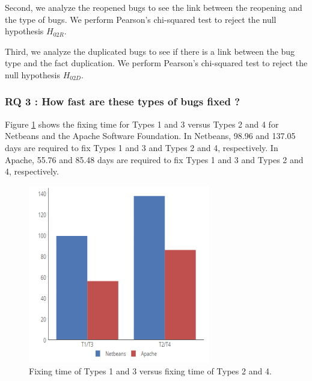 Second, we analyze the reopened bugs to see the link
between the reopening and the type of bugs. We perform
Pearson’s chi-squared test to reject the null hypothesis $H_{02R}$.

\noindent{}

Third, we analyze the duplicated bugs to see if there is a
link between the bug type and the fact duplication. We
perform Pearson’s chi-squared test to reject the null
hypothesis $H_{02D}$.

\noindent{}

\subsubsection{RQ 3 : How fast are these types of bugs fixed ?}

Figure \ref{fig:bug-taxo-rq3} shows the fixing time for Types 1 and 3 versus
Types 2 and 4 for Netbeans and the Apache Software
Foundation. In Netbeans, 98.96 and 137.05 days are required
to fix Types 1 and 3 and Types 2 and 4, respectively. In
Apache, 55.76 and 85.48 days are required to fix Types 1 and
3 and Types 2 and 4, respectively.


\begin{figure}[h!]
  \centering
    \includegraphics[scale=0.8]{media/bug-taxo-rq3.png}
    \caption{Fixing time of Types 1 and 3 versus fixing time of Types 2 and 4.
    \label{fig:bug-taxo-rq3}}
\end{figure}

